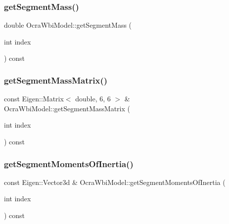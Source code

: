 \hypertarget{classocra__icub_1_1OcraWbiModel_a54db828a81022e7855845bb0ce9d22aa}{}\label{classocra__icub_1_1OcraWbiModel_a54db828a81022e7855845bb0ce9d22aa} 
\subsubsection{\texorpdfstring{get\+Segment\+Mass()}{getSegmentMass()}}
{\footnotesize\ttfamily double Ocra\+Wbi\+Model\+::get\+Segment\+Mass (\begin{DoxyParamCaption}\item[{int}]{index }\end{DoxyParamCaption}) const\hspace{0.3cm}{\ttfamily [virtual]}}

\hypertarget{classocra__icub_1_1OcraWbiModel_ac8cdf27453a0a6856d35bec89da2db40}{}\label{classocra__icub_1_1OcraWbiModel_ac8cdf27453a0a6856d35bec89da2db40} 
\subsubsection{\texorpdfstring{get\+Segment\+Mass\+Matrix()}{getSegmentMassMatrix()}}
{\footnotesize\ttfamily const Eigen\+::\+Matrix$<$ double, 6, 6 $>$ \& Ocra\+Wbi\+Model\+::get\+Segment\+Mass\+Matrix (\begin{DoxyParamCaption}\item[{int}]{index }\end{DoxyParamCaption}) const\hspace{0.3cm}{\ttfamily [virtual]}}

\hypertarget{classocra__icub_1_1OcraWbiModel_a38d92d1a46b637d47b4588725e5dec8e}{}\label{classocra__icub_1_1OcraWbiModel_a38d92d1a46b637d47b4588725e5dec8e} 
\subsubsection{\texorpdfstring{get\+Segment\+Moments\+Of\+Inertia()}{getSegmentMomentsOfInertia()}}
{\footnotesize\ttfamily const Eigen\+::\+Vector3d \& Ocra\+Wbi\+Model\+::get\+Segment\+Moments\+Of\+Inertia (\begin{DoxyParamCaption}\item[{int}]{index }\end{DoxyParamCaption}) const\hspace{0.3cm}{\ttfamily [virtual]}}

